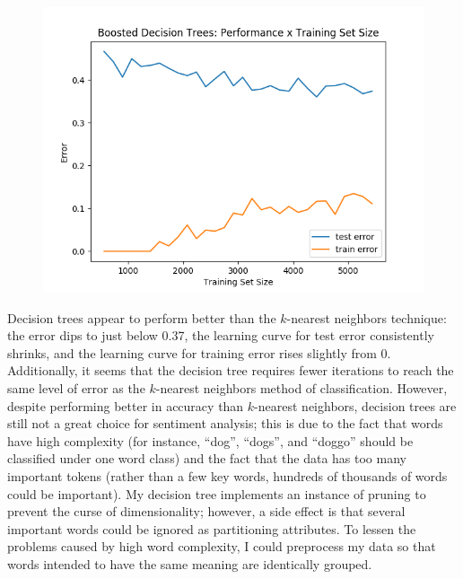 \documentclass[11pt, a4paper]{article} %
\begin{document}
\begin{figure}
\centering
\includegraphics[scale=0.525]{BoostedTSS2.png}
\end{figure}
Decision trees appear to perform better than the $k$-nearest neighbors technique: the error dips to just below 0.37, the learning curve for test error consistently shrinks, and the learning curve for training error rises slightly from 0. Additionally, it seems that the decision tree requires fewer iterations to reach the same level of error as the $k$-nearest neighbors method of classification. However, despite performing better in accuracy than $k$-nearest neighbors, decision trees are still not a great choice for sentiment analysis; this is due to the fact that words have high complexity (for instance, ``dog'', ``dogs'', and ``doggo'' should be classified under one word class) and the fact that the data has too many important tokens (rather than a few key words, hundreds of thousands of words could be important). My decision tree implements an instance of pruning to prevent the curse of dimensionality; however, a side effect is that several important words could be ignored as partitioning attributes. To lessen the problems caused by high word complexity, I could preprocess my data so that words intended to have the same meaning are identically grouped.
\end{document}
